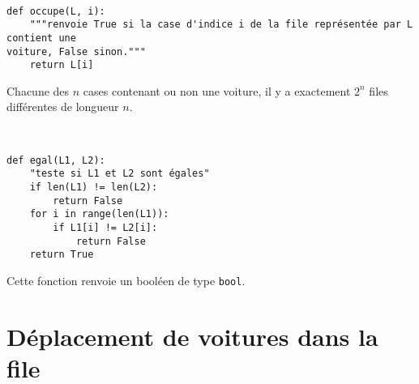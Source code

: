 \ifprof
\begin{corrige}~\\ \vspace{-.5cm}
\begin{lstlisting}
def occupe(L, i):
    """renvoie True si la case d'indice i de la file représentée par L contient une 
voiture, False sinon."""
    return L[i]
\end{lstlisting}
\end{corrige}
\else
\fi

\ifprof
\begin{corrige}
Chacune des $n$ cases contenant ou non une voiture, il y a exactement $2^n$ files différentes de longueur $n$.
\end{corrige}
\else
\fi

\ifprof
\begin{corrige} ~\\ \vspace{-.5cm}
\begin{lstlisting} 
def egal(L1, L2):
    "teste si L1 et L2 sont égales"
    if len(L1) != len(L2):
        return False
    for i in range(len(L1)):
        if L1[i] != L2[i]:
            return False
    return True
\end{lstlisting}
\end{corrige}
\else
\fi
%

\ifprof
\begin{corrige}
 Cette fonction renvoie un booléen de type \lstinline{bool}.
\end{corrige}
\else
\fi


\section{Déplacement de voitures dans la file}

